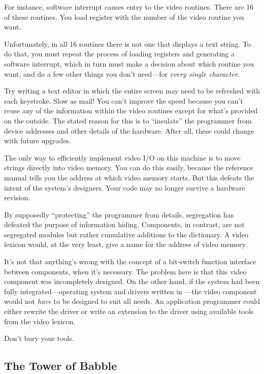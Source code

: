 For instance, software interrupt  causes entry to the video
routines. There are 16 of these routines. You load register  with
the number of the video routine you want.

Unfortunately, in all 16 routines there is not one that displays a text
string. To do that, you must repeat the process of loading registers and
generating a software interrupt, which in turn must make a decision
about which routine you want, and do a few other things you don't
need---for \emph{every single character}.

Try writing a text editor in which the entire screen may need to be
refreshed with each keystroke. Slow as mail! You can't improve the speed
because you can't reuse any of the information within the video routines
except for what's provided on the outside. The stated reason for this is to
``insulate'' the programmer from device addresses and other details of
the hardware. After all, these could change with future upgrades.

The only way to efficiently implement video I/O on this machine is
to move strings directly into video memory. You can do this easily,
because the reference manual tells you the address at which video
memory starts. But this defeats the intent of the system's designers.
Your code may no longer survive a hardware revision.

By supposedly ``protecting'' the programmer from details, segregation
has defeated the purpose of information hiding. Components, in
contrast, are not segregated modules but rather cumulative additions
to the dictionary. A video lexicon would, at the very least, give a
name for the address of video memory.

It's not that anything's wrong with the concept of a bit-switch
function interface between components, when it's necessary. The
problem here is that this video component was incompletely
designed. On the other hand, if the system had been fully
integrated---operating system and drivers written in \Forth{}---the video
component would not \emph{have} to be designed to suit all needs. An
application programmer could either rewrite the driver or write an
extension to the driver using available tools from the video lexicon.

\begin{tip}
Don't bury your tools.
\end{tip}

\subsection{The Tower of Babble}

